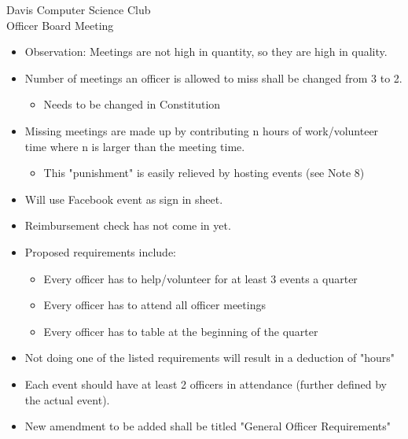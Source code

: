 \documentclass{article}
\begin{document}
\begin{Minutes}{Davis Computer Science Club\\Officer Board Meeting}
\begin{itemize}
    \item Observation: Meetings are not high in quantity, so they are high in quality.
    \item Number of meetings an officer is allowed to miss shall be changed from 3 to 2. 
        \begin{itemize}
            \item Needs to be changed in Constitution
        \end{itemize}
    \item Missing meetings are made up by contributing n hours of work/volunteer time where n is larger than the meeting time.
        \begin{itemize}
            \item This "punishment" is easily relieved by hosting events (see Note 8)
        \end{itemize}
\end{itemize}

\begin{itemize}
    \item Will use Facebook event as sign in sheet.
    \item Reimbursement check has not come in yet.
\end{itemize}

\begin{itemize}
    \item Proposed requirements include:
    \begin{itemize}
        \item Every officer has to help/volunteer for at least 3 events a quarter
        \item Every officer has to attend all officer meetings
        \item Every officer has to table at the beginning of the quarter
    \end{itemize}
    \item Not doing one of the listed requirements will result in a deduction of "hours"
    \item Each event should have at least 2 officers in attendance (further defined by the actual event). 
    \item New amendment to be added shall be titled "General Officer Requirements"
\end{itemize}


\begin{itemize}
    

\end{itemize}
\end{Minutes}
\end{document}
